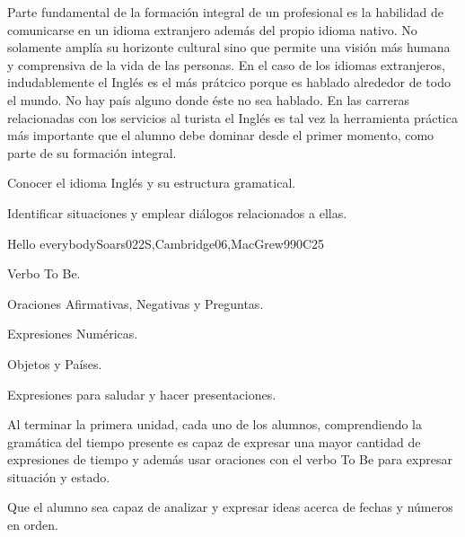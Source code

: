 \begin{syllabus}


\begin{justification}
Parte fundamental de la formación integral de un profesional es la habilidad de comunicarse en un idioma extranjero además del propio idioma nativo. No solamente amplía su horizonte cultural sino que permite una visión más humana y comprensiva de la vida de las personas. En el caso de los idiomas extranjeros, indudablemente el Inglés es el más prátcico porque es hablado alrededor de todo el mundo. No hay país alguno donde éste no sea hablado. En las carreras relacionadas con los servicios al turista el Inglés es tal vez la herramienta práctica más importante que el alumno debe dominar desde el primer momento, como parte de su formación integral.
\end{justification}

\begin{goals}
\item Conocer el idioma Inglés y su estructura gramatical.
\item Identificar situaciones y emplear diálogos relacionados a ellas.
\end{goals}

\begin{outcomes}
\item {}
\end{outcomes}

\begin{competences}
    \item {}
\end{competences}

\begin{unit}{Hello everybody}{}{Soars022S,Cambridge06,MacGrew99}{0}{C25}
   \begin{topics}
      \item Verbo To Be.
      \item Oraciones Afirmativas, Negativas y Preguntas.
      \item Expresiones Numéricas.
      \item Objetos y Paí­ses.
      \item Expresiones para saludar y hacer presentaciones.
   \end{topics}

   \begin{learningoutcomes}
      \item Al terminar la primera unidad, cada uno de los alumnos, comprendiendo la gramática del tiempo presente es capaz de expresar una mayor cantidad de expresiones de tiempo y además usar oraciones con el verbo To Be para expresar situación y estado. 
      \item Que el alumno sea capaz de analizar y expresar ideas acerca de fechas y números en orden. 
   \end{learningoutcomes}
\end{unit}


\end{syllabus}
